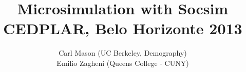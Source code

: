 \documentclass[11pt]{article}
\begin{document}
\title{Microsimulation with Socsim\\
CEDPLAR, Belo Horizonte 2013 }
\author{Carl Mason (UC Berkeley, Demography)\\
Emilio Zagheni (Queens College - CUNY)\\
}


%
%
%
%
%
%
%

 
\end{document}
